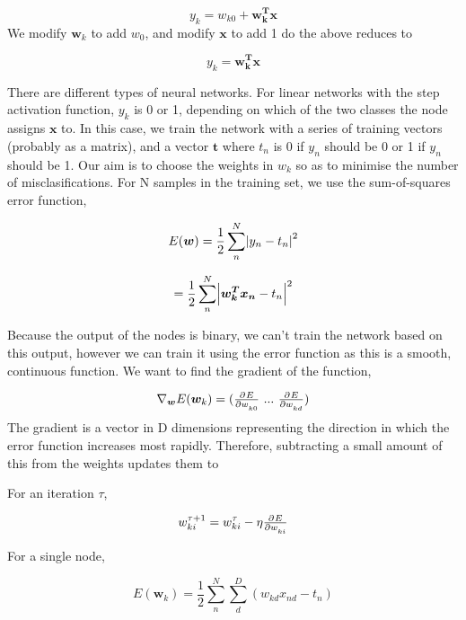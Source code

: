 \documentclass[10pt,a4paper]{article}
\newcommand{\su}[2]{\sum\limits_{#1}^{#2}}
\newcommand{\re}[1]{\frac{1}{#1}}
\begin{document}
	\begin{equation*}
		y_k = w_{k0} + \bm{w_k^Tx}
	\end{equation*}
	We modify $\bm w_k$ to add $w_0$, and modify $\bm x$ to add 1 do the above reduces to 

	\begin{equation*}
		y_k = \bm{w_k^Tx}
	\end{equation*}
	
	There are different types of neural networks. For linear networks with the step activation function, $y_k$ is 0 or 1, depending on which of the two classes the node assigns $\bm x$ to. In this case, we train the network with a series of training vectors (probably as a matrix), and a vector $\bm t$ where $t_n$ is 0 if $y_n$ should be 0 or 1 if $y_n$ should be 1.
	Our aim is to choose the weights in $w_k$ so as to minimise the number of misclasifications. For N samples in the training set, we use the sum-of-squares error function,
	
	\begin{equation*}
		E(\bm w) = \re{2} \su{n}{N} \abs{y_n - t_n}^2
	\end{equation*} 
	
	\begin{equation*}
	= \re{2} \su{n}{N} \abs{\bm {w_k^Tx_n} - t_n}^2
	\end{equation*} 
	
	Because the output of the nodes is binary, we can't train the network based on this output, however we can train it using the error function as this is a smooth, continuous function. We want to find the gradient of the function, 
	
	\begin{equation*}
		\nabla_{\bm w} E(\bm w_k) = (\pd{E}{w_{k0}} \text{  } ... \text{  } \pd{E}{w_{kd}})
	\end{equation*}
	The gradient is a vector in D dimensions representing the direction in which the error function increases most rapidly. Therefore, subtracting a small amount of this from the weights updates them to 
	
	For an iteration $\tau$, 
	
	\begin{equation*}
		w_{ki}^{\tau + 1} = w_{ki}^{\tau} - \eta \pd{E}{w_{ki}} 
	\end{equation*}
	
	For a single node,
	
	\begin{equation*}
		E(\bm w_k) = \re{2} \su{n}{N} \su{d}{D}(w_{kd}x_{nd} - t_{n})
	\end{equation*}
	
\end{document}

